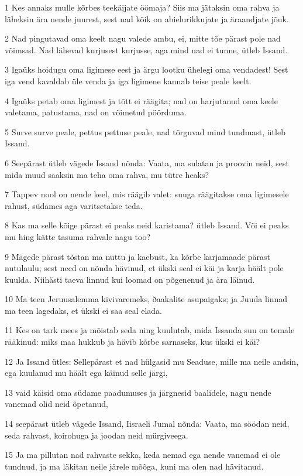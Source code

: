 \par 1 Kes annaks mulle kõrbes teekäijate öömaja? Siis ma jätaksin oma rahva ja läheksin ära nende juurest, sest nad kõik on abielurikkujate ja äraandjate jõuk.
\par 2 Nad pingutavad oma keelt nagu valede ambu, ei, mitte tõe pärast pole nad võimsad. Nad lähevad kurjusest kurjusse, aga mind nad ei tunne, ütleb Issand.
\par 3 Igaüks hoidugu oma ligimese eest ja ärgu lootku ühelegi oma vendadest! Sest iga vend kavaldab üle venda ja iga ligimene kannab teise peale keelt.
\par 4 Igaüks petab oma ligimest ja tõtt ei räägita; nad on harjutanud oma keele valetama, patustama, nad on võimetud pöörduma.
\par 5 Surve surve peale, pettus pettuse peale, nad tõrguvad mind tundmast, ütleb Issand.
\par 6 Seepärast ütleb vägede Issand nõnda: Vaata, ma sulatan ja proovin neid, sest mida muud saaksin ma teha oma rahva, mu tütre heaks?
\par 7 Tappev nool on nende keel, mis räägib valet: suuga räägitakse oma ligimesele rahust, südames aga varitsetakse teda.
\par 8 Kas ma selle kõige pärast ei peaks neid karistama? ütleb Issand. Või ei peaks mu hing kätte tasuma rahvale nagu too?
\par 9 Mägede pärast tõstan ma nuttu ja kaebust, ka kõrbe karjamaade pärast nutulaulu; sest need on nõnda hävinud, et ükski seal ei käi ja karja häält pole kuulda. Niihästi taeva linnud kui loomad on põgenenud ja ära läinud.
\par 10 Ma teen Jeruusalemma kivivaremeks, ðaakalite asupaigaks; ja Juuda linnad ma teen lagedaks, et ükski ei saa seal elada.
\par 11 Kes on tark mees ja mõistab seda ning kuulutab, mida Issanda suu on temale rääkinud: miks maa hukkub ja hävib kõrbe sarnaseks, kus ükski ei käi?
\par 12 Ja Issand ütles: Sellepärast et nad hülgasid mu Seaduse, mille ma neile andsin, ega kuulanud mu häält ega käinud selle järgi,
\par 13 vaid käisid oma südame paadumuses ja järgnesid baalidele, nagu nende vanemad olid neid õpetanud,
\par 14 seepärast ütleb vägede Issand, Iisraeli Jumal nõnda: Vaata, ma söödan neid, seda rahvast, koirohuga ja joodan neid mürgiveega.
\par 15 Ja ma pillutan nad rahvaste sekka, keda nemad ega nende vanemad ei ole tundnud, ja ma läkitan neile järele mõõga, kuni ma olen nad hävitanud.
